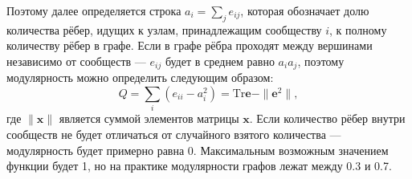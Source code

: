 \documentclass{matmex-diploma}
\begin{document}
Поэтому далее определяется строка $a_i = \sum_j{e_{ij}}$, которая обозначает долю количества рёбер, идущих к узлам, принадлежащим сообществу $i$, к полному количеству рёбер в графе. Если в графе рёбра проходят между вершинами независимо от сообществ --- $e_{ij}$ будет в среднем равно $a_i a_j$, поэтому модулярность можно определить следующим образом:
$$Q = \sum_i{\left(e_{ii} - a_i^2\right)} = \mathrm{Tr} \mathbf{e} - \|\mathbf{e}^2\|,$$
где $\|\mathbf{x}\|$ является суммой элементов матрицы $\mathbf{x}$. Если количество рёбер внутри сообществ не будет отличаться от случайного взятого количества --- модулярность будет примерно равна 0. Максимальным возможным значением функции будет 1, но на практике модулярности графов лежат между 0.3 и 0.7.





\end{document}
